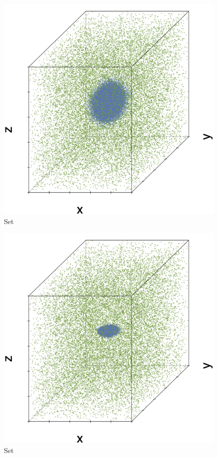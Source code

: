 \begin{subfigure}{0.23\textwidth}
	\centering
	\includegraphics[width=\textwidth]{3/img/datasetplot_ferdosi_1_60000.png}
	\caption{Set \ferdosiOne}
	\label{fig:3:simulated:datasets:ferdosi1}
\end{subfigure}
\begin{subfigure}{0.23\textwidth}
	\centering
	\includegraphics[width=\textwidth]{3/img/datasetplot_baakman_1_60000.png}
	\caption{Set \baakmanOne}
	\label{fig:3:simulated:datasets:baakman1}
\end{subfigure}
